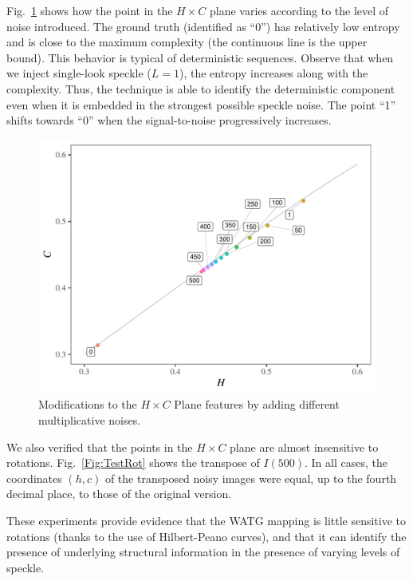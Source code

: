 Fig.~\ref{Fig:TestSpeckleHC} shows how the point in the $H\times C$ plane varies according to the level of noise introduced.
The ground truth (identified as ``\textsf{0}'') has relatively low entropy and is close to the maximum complexity (the continuous line is the upper bound).
This behavior is typical of deterministic sequences.
Observe that when we inject single-look speckle ($L=1$), the entropy increases along with the complexity.
Thus, the technique is able to identify the deterministic component even when it is embedded in the strongest possible speckle noise.
The point ``\textsf{1}'' shifts towards ``\textsf{0}'' when the signal-to-noise progressively increases.

\begin{figure}
	\includegraphics[width=\textwidth]{Figures/Waves1.pdf}
	\caption{Modifications to the $H \times C$ Plane features by adding different multiplicative noises.}
	\label{Fig:TestSpeckleHC}
\end{figure}

We also verified that the points in the $H\times C$ plane are almost insensitive to rotations.
Fig.~\ref{Fig:TestRot} shows the transpose of $I(500)$.
In all cases, the coordinates $(h,c)$ of the transposed noisy images were equal, up to the fourth decimal place, to those of the original version.

These experiments provide evidence that the WATG mapping is little sensitive to rotations (thanks to the use of Hilbert-Peano curves), and that it can identify the presence of underlying structural information in the presence of varying levels of speckle.


